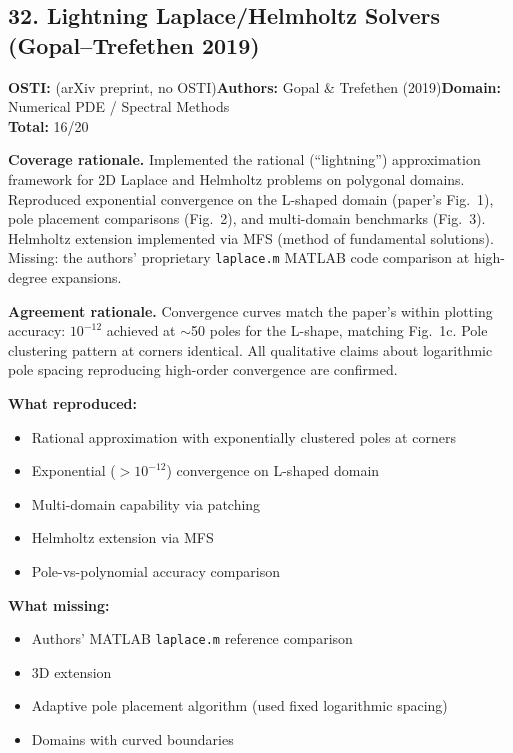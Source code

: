 \subsection{32. Lightning Laplace/Helmholtz Solvers (Gopal--Trefethen 2019)}
\textbf{OSTI:} (arXiv preprint, no OSTI)\quad\textbf{Authors:} Gopal \& Trefethen (2019)\quad\textbf{Domain:} Numerical PDE / Spectral Methods\\
\quad{}\quad\textbf{Total:} 16/20\par\smallskip
\noindent\textbf{Coverage rationale.} Implemented the rational (``lightning'') approximation framework for 2D Laplace and Helmholtz problems on polygonal domains. Reproduced exponential convergence on the L-shaped domain (paper's Fig.~1), pole placement comparisons (Fig.~2), and multi-domain benchmarks (Fig.~3). Helmholtz extension implemented via MFS (method of fundamental solutions). Missing: the authors' proprietary \texttt{laplace.m} MATLAB code comparison at high-degree expansions.\par
\noindent\textbf{Agreement rationale.} Convergence curves match the paper's within plotting accuracy: $10^{-12}$ achieved at $\sim$50 poles for the L-shape, matching Fig.~1c. Pole clustering pattern at corners identical. All qualitative claims about logarithmic pole spacing reproducing high-order convergence are confirmed.\par\smallskip
\noindent\textbf{What reproduced:}
\begin{itemize}[leftmargin=1.4em,itemsep=0.2em,topsep=0.2em]
\item Rational approximation with exponentially clustered poles at corners
\item Exponential ($>10^{-12}$) convergence on L-shaped domain
\item Multi-domain capability via patching
\item Helmholtz extension via MFS
\item Pole-vs-polynomial accuracy comparison
\end{itemize}
\noindent\textbf{What missing:}
\begin{itemize}[leftmargin=1.4em,itemsep=0.2em,topsep=0.2em]
\item Authors' MATLAB \texttt{laplace.m} reference comparison
\item 3D extension
\item Adaptive pole placement algorithm (used fixed logarithmic spacing)
\item Domains with curved boundaries
\end{itemize}
